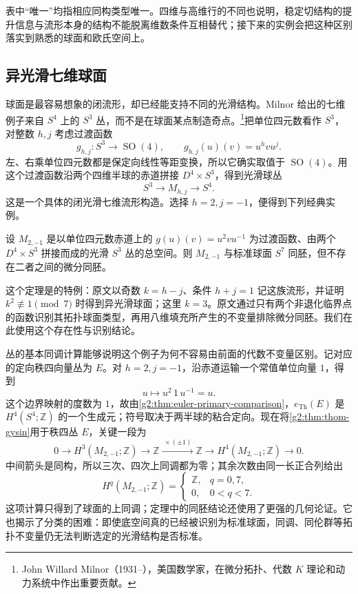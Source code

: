 表中“唯一”均指相应同构类型唯一。四维与高维行的不同也说明，稳定切结构的提升信息与流形本身的结构不能脱离维数条件互相替代；接下来的实例会把这种区别落实到熟悉的球面和欧氏空间上。

\subsection{异光滑七维球面}
\label{g2:subsec:2304:03}
球面是最容易想象的闭流形，却已经能支持不同的光滑结构。Milnor 给出的七维例子来自 \(S^4\) 上的 \(S^3\) 丛，而不是在球面某点制造奇点。\footnote{John Willard Milnor（1931--），美国数学家，在微分拓扑、代数 \(K\) 理论和动力系统中作出重要贡献。}把单位四元数看作 \(S^3\)，对整数 \(h,j\) 考虑过渡函数
\[
	g_{h,j}\colon S^3\longrightarrow\operatorname{SO}(4),
	\qquad g_{h,j}(u)(v)=u^hvu^j.
\]
左、右乘单位四元数都是保定向线性等距变换，所以它确实取值于 \(\operatorname{SO}(4)\)。用这个过渡函数沿两个四维半球的赤道拼接 \(D^4\times S^3\)，得到光滑球丛
\[
	S^3\longrightarrow M_{h,j}\longrightarrow S^4.
\]
这是一个具体的闭光滑七维流形构造。选择 \(h=2,j=-1\)，便得到下列经典实例。

\begin{theorem}\label{g2:thm:milnor-exotic-seven-sphere}
	设 \(M_{2,-1}\) 是以单位四元数赤道上的 \(g(u)(v)=u^2vu^{-1}\) 为过渡函数、由两个 \(D^4\times S^3\) 拼接而成的光滑 \(S^3\) 丛的总空间。则 \(M_{2,-1}\) 与标准球面 \(S^7\) 同胚，但不存在二者之间的微分同胚。
\end{theorem}

这个定理是\cite[第3节，定理3，第402--404页]{Milnor1956ExoticSpheres}的特例：原文以奇数 \(k=h-j\)、条件 \(h+j=1\) 记这族流形，并证明 \(k^2\not\equiv1\pmod7\) 时得到异光滑球面；这里 \(k=3\)。原文通过只有两个非退化临界点的函数识别其拓扑球面类型，再用八维填充所产生的不变量排除微分同胚。我们在此使用这个存在性与识别结论。

\ProseParagraphBreak

丛的基本同调计算能够说明这个例子为何不容易由前面的代数不变量区别。记对应的定向秩四向量丛为 \(E\)。对 \(h=2,j=-1\)，沿赤道运输一个常值单位向量 \(1\)，得到
\[
	u\longmapsto u^2\,1\,u^{-1}=u.
\]
这个边界映射的度数为 \(1\)，故由\cref{g2:thm:euler-primary-comparison}，\(e_{\mathrm{Th}}(E)\) 是 \(H^4(S^4;\mathbb Z)\) 的一个生成元；符号取决于两半球的粘合定向。现在将\cref{g2:thm:thom-gysin}用于秩四丛 \(E\)，关键一段为
\[
	0\longrightarrow H^3(M_{2,-1};\mathbb Z)
	\longrightarrow\mathbb Z\xrightarrow{\ \times(\pm1)\ }\mathbb Z
	\longrightarrow H^4(M_{2,-1};\mathbb Z)\longrightarrow0.
\]
中间箭头是同构，所以三次、四次上同调都为零；其余次数由同一长正合列给出
\[
	H^q(M_{2,-1};\mathbb Z)=
	\begin{cases}
		\mathbb Z,&q=0,7,\\
		0,&0<q<7.
	\end{cases}
\]
这项计算只得到了球面的上同调；定理中的同胚结论还使用了更强的几何论证。它也揭示了分类的困难：即使底空间真的已经被识别为标准球面，同调、同伦群等拓扑不变量仍无法判断选定的光滑结构是否标准。

